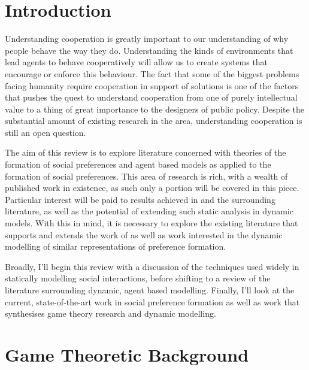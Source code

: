 \documentclass[11pt]{article}
\newcommand*{\np}{\par\noindent\newline}
\begin{document}
\newpage
\tableofcontents
\newpage
\section{Introduction}\label{intro}
Understanding cooperation is greatly important to our understanding of why people behave the way they do.
Understanding the kinds of environments that lead agents to behave cooperatively will allow us to create systems that
encourage or enforce this behaviour. The fact that some of the biggest problems facing humanity require cooperation in
support of solutions is one of the factors that pushes the quest to understand cooperation from one of purely
intellectual value to a thing of great importance to the designers of public policy. Despite the substantial amount of
existing research in the area, understanding cooperation is still an open question.

\np The aim of this review is to explore literature concerned with theories of the formation of social preferences and
agent based models as applied to the formation of social preferences. This area of research is rich, with a wealth of
published work in existence, as such only a portion will be covered in this piece. Particular interest will be paid to
results achieved in \citet{alger_homo_2013} and the surrounding literature, as well as the potential of extending such
static analysis in dynamic models. With this in mind, it is necessary to explore the existing literature that supports
and extends the work of \citet{alger_homo_2013} as well as work interested in the dynamic modelling of similar
representations of preference formation.

\np Broadly, I'll begin this review with a discussion of the techniques used widely in statically modelling social interactions, before shifting to a review of the literature surrounding dynamic, agent based modelling.
Finally, I'll look at the current, state-of-the-art work in social preference formation as well as work that
synthesises game theory research and dynamic modelling.


\section{Game Theoretic Background}\label{social}
\end{document}
